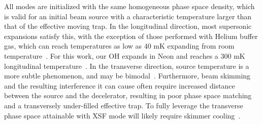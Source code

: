 \documentclass[%
 reprint,
 amsmath,amssymb,
 aps,
prl,
]{revtex4-1}
\begin{document}
All modes are initialized with the same homogeneous phase space density, which is valid for an initial beam source with a characteristic temperature larger than that of the effective moving trap.
In the longitudinal direction, most supersonic expansions satisfy this, with the exception of those performed with Helium buffer gas, which can reach temperatures as low as $40\text{ mK}$ expanding from room temperature~\cite{Even2014}.
For this work, our OH expands in Neon and reaches a $300\text{ mK}$ longitudinal temperature~\cite{Wu2018}.
In the transverse direction, source temperature is a more subtle phenomenon, and may be bimodal~\cite{Beijerinck1981}.
Furthermore, beam skimming and the resulting interference it can cause often require increased distance between the source and the decelerator, resulting in poor phase space matching and a transversely under-filled effective trap.
To fully leverage the transverse phase space attainable with XSF mode will likely require skimmer cooling~\cite{Wu2018}.



\end{document}
